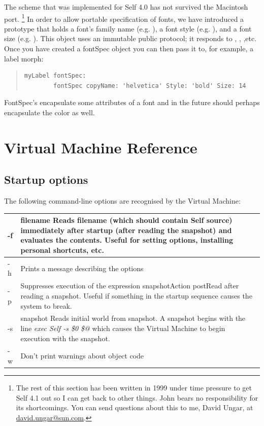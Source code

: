 \documentclass[letterpaper,10pt,english]{sphinxmanual}
\begin{document}
The scheme that was implemented for Self 4.0 has not survived the Macintosh port. \footnote{
The rest of this section has been written in 1999 under time pressure to get Self 4.1 out so I can get back to other things. John bears no responsibility for its shortcomings. You can send questions about this to me, David Ungar, at \href{mailto:david.ungar@sun.com}{david.ungar@sun.com}.
} In order to allow portable specification of fonts, we have introduced a  prototype that holds a font's family name (e.g. ), a font style (e.g. ), and a font size (e.g. ). This object uses an immutable public protocol; it responds to , , ,etc. Once you have created a fontSpec object you can then pass it to, for example, a label morph:
\begin{quote}

\begin{Verbatim}[commandchars=\\\{\}]
myLabel fontSpec:
        fontSpec copyName: 'helvetica' Style: 'bold' Size: 14
\end{Verbatim}
\end{quote}

FontSpec's encapsulate some attributes of a font and in the future should perhaps encapsulate the color as well.


\chapter{Virtual Machine Reference}
\label{vmref:virtual-machine-reference}\label{vmref::doc}

\section{Startup options}
\label{vmref:startup-options}
The following command-line options are recognised by the Virtual Machine:

\begin{tabulary}{\linewidth}{|L|L|}
\hline

-f
 & 
filename Reads filename (which should contain Self source) immediately after startup (after reading the snapshot) and evaluates the contents. Useful for setting options, installing personal shortcuts, etc.
\\\hline

-h
 & 
Prints a message describing the options
\\\hline

-p
 & 
Suppresses execution of the expression snapshotAction postRead after reading a snapshot. Useful if something in the startup sequence causes the system to break.
\\\hline

-s
 & 
snapshot Reads initial world from snapshot. A snapshot begins with the line \emph{exec Self -s \$0 \$@} which causes the Virtual Machine to begin execution with the snapshot.
\\\hline

-w
 & 
Don’t print warnings about object code
\\\hline
\end{tabulary}
\end{document}
